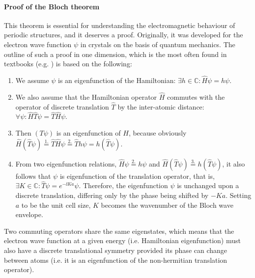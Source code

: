 \paragraph{Proof of the Bloch theorem}%
This theorem is essential for understanding the electromagnetic behaviour of periodic structures, and it deserves a proof. Originally, it was developed for the electron wave function $\psi$ in crystals on the basis of quantum mechanics. The outline of such a proof in one dimension, which is the most often found in textbooks (e.g. \cite[p. 134]{ashcroft2005solid}) is based on the following:
\begin{enumerate}
 \item{We assume $\psi$ is an eigenfunction of the Hamiltonian: $\exists h\in \mathbb{C}: \hat H\psi = h\psi$.} 
 \item{We also assume that the Hamiltonian operator $\hat H$ commutes with the operator of discrete translation $\hat T$ by the inter-atomic distance: $\forall \psi: \hat H\hat T\psi = \hat T\hat H\psi$. } 
 \item{Then $(T\psi)$ is an eigenfunction of $H$, because obviously $\hat H(\hat T\psi) \stackrel{1.}{=} \hat T\hat H\psi \stackrel{2.}{=} \hat Th\psi = h(\hat T\psi)$.  }
 \item{From two eigenfunction relations, $\hat H\psi\stackrel{2.}{=} h\psi$ and $\hat H(\hat T\psi) \stackrel{3.}{=} h(\hat T\psi)$, it also follows that $\psi$ is eigenfunction of the translation operator, that is,
$\exists K\in \mathbb{C}: \hat T\psi = e^{-\ii Ka}\psi$.  Therefore, the eigenfunction $\psi$ is unchanged upon a discrete translation, differing only by the phase being shifted by $-Ka$. Setting $a$ to be the unit cell size, $K$ becomes the wavenumber of the Bloch wave envelope.
}
 \end{enumerate}
Two commuting operators share the same eigenstates, which means that the electron wave function at a given energy (i.e. Hamiltonian eigenfunction) must also have a discrete translational symmetry provided its phase can change between atoms (i.e. it is an eigenfunction of the non-hermitian translation operator).

